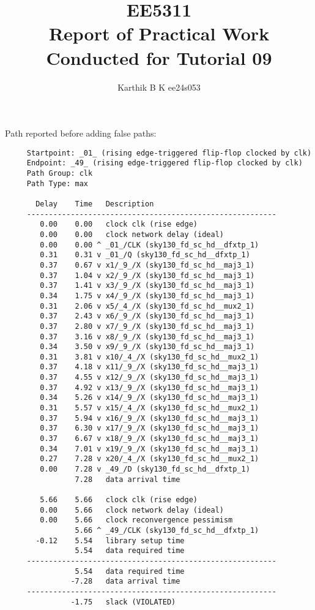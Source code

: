 \documentclass[12pt,a4paper]{article}
\begin{document}
\title{EE5311 \\ Report of Practical Work Conducted for Tutorial 09}
\author{Karthik B K ee24s053}
\maketitle

Path reported before adding false paths:

\begin{verbatim}
     Startpoint: _01_ (rising edge-triggered flip-flop clocked by clk)
     Endpoint: _49_ (rising edge-triggered flip-flop clocked by clk)
     Path Group: clk
     Path Type: max
     
       Delay    Time   Description
     ---------------------------------------------------------
        0.00    0.00   clock clk (rise edge)
        0.00    0.00   clock network delay (ideal)
        0.00    0.00 ^ _01_/CLK (sky130_fd_sc_hd__dfxtp_1)
        0.31    0.31 v _01_/Q (sky130_fd_sc_hd__dfxtp_1)
        0.37    0.67 v x1/_9_/X (sky130_fd_sc_hd__maj3_1)
        0.37    1.04 v x2/_9_/X (sky130_fd_sc_hd__maj3_1)
        0.37    1.41 v x3/_9_/X (sky130_fd_sc_hd__maj3_1)
        0.34    1.75 v x4/_9_/X (sky130_fd_sc_hd__maj3_1)
        0.31    2.06 v x5/_4_/X (sky130_fd_sc_hd__mux2_1)
        0.37    2.43 v x6/_9_/X (sky130_fd_sc_hd__maj3_1)
        0.37    2.80 v x7/_9_/X (sky130_fd_sc_hd__maj3_1)
        0.37    3.16 v x8/_9_/X (sky130_fd_sc_hd__maj3_1)
        0.34    3.50 v x9/_9_/X (sky130_fd_sc_hd__maj3_1)
        0.31    3.81 v x10/_4_/X (sky130_fd_sc_hd__mux2_1)
        0.37    4.18 v x11/_9_/X (sky130_fd_sc_hd__maj3_1)
        0.37    4.55 v x12/_9_/X (sky130_fd_sc_hd__maj3_1)
        0.37    4.92 v x13/_9_/X (sky130_fd_sc_hd__maj3_1)
        0.34    5.26 v x14/_9_/X (sky130_fd_sc_hd__maj3_1)
        0.31    5.57 v x15/_4_/X (sky130_fd_sc_hd__mux2_1)
        0.37    5.94 v x16/_9_/X (sky130_fd_sc_hd__maj3_1)
        0.37    6.30 v x17/_9_/X (sky130_fd_sc_hd__maj3_1)
        0.37    6.67 v x18/_9_/X (sky130_fd_sc_hd__maj3_1)
        0.34    7.01 v x19/_9_/X (sky130_fd_sc_hd__maj3_1)
        0.27    7.28 v x20/_4_/X (sky130_fd_sc_hd__mux2_1)
        0.00    7.28 v _49_/D (sky130_fd_sc_hd__dfxtp_1)
                7.28   data arrival time
     
        5.66    5.66   clock clk (rise edge)
        0.00    5.66   clock network delay (ideal)
        0.00    5.66   clock reconvergence pessimism
                5.66 ^ _49_/CLK (sky130_fd_sc_hd__dfxtp_1)
       -0.12    5.54   library setup time
                5.54   data required time
     ---------------------------------------------------------
                5.54   data required time
               -7.28   data arrival time
     ---------------------------------------------------------
               -1.75   slack (VIOLATED)
\end{verbatim}
\end{document}
